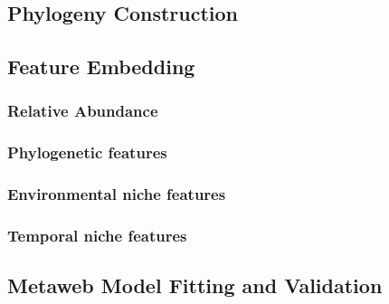 \documentclass[11pt]{article}
\begin{document}
\hypertarget{phylogeny-construction}{%
\subsection{Phylogeny Construction}\label{phylogeny-construction}}

\hypertarget{feature-embedding}{%
\subsection{Feature Embedding}\label{feature-embedding}}

\hypertarget{relative-abundance}{%
\subsubsection{Relative Abundance}\label{relative-abundance}}

\hypertarget{phylogenetic-features}{%
\subsubsection{Phylogenetic features}\label{phylogenetic-features}}

\hypertarget{environmental-niche-features}{%
\subsubsection{Environmental niche
features}\label{environmental-niche-features}}

\hypertarget{temporal-niche-features}{%
\subsubsection{Temporal niche features}\label{temporal-niche-features}}

\hypertarget{metaweb-model-fitting-and-validation}{%
\subsection{Metaweb Model Fitting and
Validation}\label{metaweb-model-fitting-and-validation}}
\end{document}
